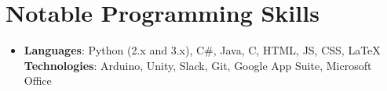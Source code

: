 \documentclass[letterpaper,11pt]{article}
\newcommand{\resumeSubHeadingListStart}{\begin{itemize}[leftmargin=*]}
\newcommand{\resumeSubHeadingListEnd}{\end{itemize}}
\begin{document}
%
\section{Notable Programming Skills}
  \resumeSubHeadingListStart
    \item{
      \textbf{Languages}{: Python (2.x and 3.x), C\#, Java, C, HTML, JS, CSS, LaTeX}
      \hfill
      \\
      \textbf{Technologies}{: Arduino, Unity, Slack, Git, Google App Suite, Microsoft Office}
    }

  \resumeSubHeadingListEnd


\end{document}
